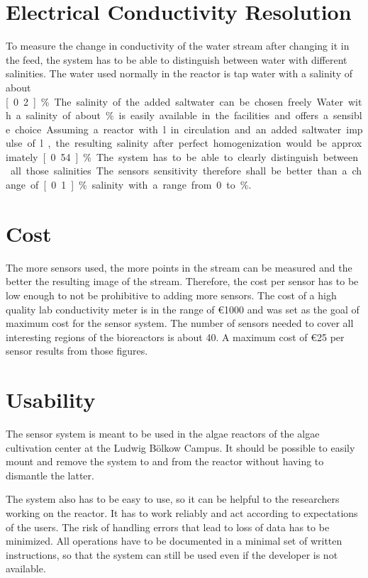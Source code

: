 \section{Electrical Conductivity Resolution}

To measure the change in conductivity of the water stream after changing it in the feed, the system has to be able to distinguish between water with different salinities. The water used normally in the reactor is tap water with a salinity of about \unit[0.2]{\%}. The salinity of the added saltwater can be chosen freely. Water with a salinity of about \unit[5]{\%} is easily available in the facilities and offers a sensible choice. Assuming a reactor with \unit[65]{l} in circulation and an added saltwater impulse of \unit[5]{l}, the resulting salinity after perfect homogenization would be approximately \unit[0.54]{\%}. The system has to be able to clearly distinguish between all those salinities. The sensors sensitivity therefore shall be better than a change of \unit[0.1]{\%} salinity with a range from 0 to \unit[5]{\%}.

\section{Cost}

The more sensors used, the more points in the stream can be measured and the better the resulting image of the stream. Therefore, the cost per sensor has to be low enough to not be prohibitive to adding more sensors.
The cost of a high quality lab conductivity meter is in the range of \euro{1000} and was set as the goal of maximum cost for the sensor system. The number of sensors needed to cover all interesting regions of the bioreactors is about 40.
A maximum cost of \euro{25} per sensor results from those figures.

\section{Usability}

The sensor system is meant to be used in the algae reactors of the algae cultivation center at the Ludwig Bölkow Campus. It should be possible to easily mount and remove the system to and from the reactor without having to dismantle the latter.

The system also has to be easy to use, so it can be helpful to the researchers working on the reactor. It has to work reliably and act according to expectations of the users. The risk of handling errors that lead to loss of data has to be minimized. All operations have to be documented in a minimal set of written instructions, so that the system can still be used even if the developer is not available.

